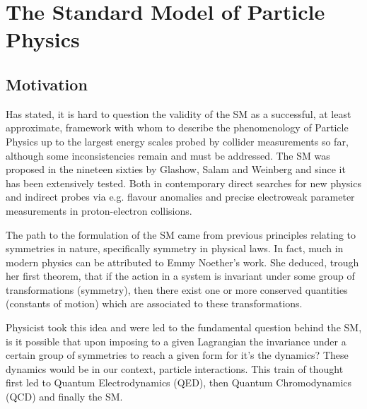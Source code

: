 
\chapter{The Standard Model of Particle Physics}
%
%
\section{Motivation}


Has stated, it is hard to question the validity of the SM as a successful, at least approximate, framework with whom to describe the phenomenology of Particle Physics up to the largest energy scales probed by collider measurements so far, although some inconsistencies remain and must be addressed.  
%
The SM was proposed in the nineteen sixties by Glashow, Salam and Weinberg and since it has been extensively tested. Both in contemporary direct searches for new physics and indirect probes via e.g. flavour anomalies and precise electroweak parameter measurements in proton-electron collisions. %

The path to the formulation of the SM came from previous principles relating to symmetries in nature, specifically symmetry in physical laws. 
%
In fact, much in modern physics can be attributed to Emmy Noether's work. She deduced, trough her first theorem, that if the action in a system is invariant under some group of transformations (symmetry), then there exist one or more conserved quantities (constants of motion) which are associated to these transformations. 

Physicist took this idea and were led to the fundamental question behind the SM, is it possible that upon imposing to a given Lagrangian the invariance under a certain group of symmetries to reach a given form for it's the dynamics? 
%
These dynamics would be in our context, particle interactions. This train of thought first led to Quantum Electrodynamics (QED), then Quantum Chromodynamics (QCD) and finally the SM. 

